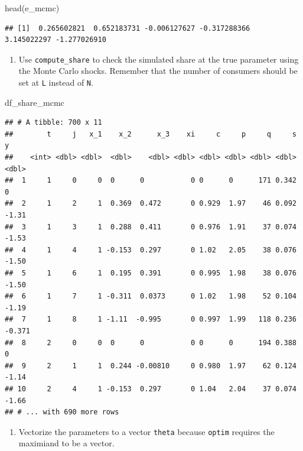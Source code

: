 \documentclass[
]{book}
\newenvironment{Shaded}{\begin{snugshade}}{\end{snugshade}}
\newcommand{\FunctionTok}[1]{\textcolor[rgb]{0.00,0.00,0.00}{#1}}
\newcommand{\NormalTok}[1]{#1}
\providecommand{\tightlist}{%
  \setlength{\itemsep}{0pt}\setlength{\parskip}{0pt}}
\begin{document}
\begin{Shaded}
\begin{Highlighting}[]
\FunctionTok{head}\NormalTok{(e\_mcmc)}
\end{Highlighting}
\end{Shaded}

\begin{verbatim}
## [1]  0.265602821  0.652183731 -0.006127627 -0.317288366  3.145022297 -1.277026910
\end{verbatim}

\begin{enumerate}
\def\labelenumi{\arabic{enumi}.}
\setcounter{enumi}{2}
\tightlist
\item
  Use \texttt{compute\_share} to check the simulated share at the true parameter using the Monte Carlo shocks. Remember that the number of consumers should be set at \texttt{L} instead of \texttt{N}.
\end{enumerate}

\begin{Shaded}
\begin{Highlighting}[]
\NormalTok{df\_share\_mcmc}
\end{Highlighting}
\end{Shaded}

\begin{verbatim}
## # A tibble: 700 x 11
##        t     j   x_1    x_2      x_3    xi     c     p     q     s      y
##    <int> <dbl> <dbl>  <dbl>    <dbl> <dbl> <dbl> <dbl> <dbl> <dbl>  <dbl>
##  1     1     0     0  0      0           0 0      0      171 0.342  0    
##  2     1     2     1  0.369  0.472       0 0.929  1.97    46 0.092 -1.31 
##  3     1     3     1  0.288  0.411       0 0.976  1.91    37 0.074 -1.53 
##  4     1     4     1 -0.153  0.297       0 1.02   2.05    38 0.076 -1.50 
##  5     1     6     1  0.195  0.391       0 0.995  1.98    38 0.076 -1.50 
##  6     1     7     1 -0.311  0.0373      0 1.02   1.98    52 0.104 -1.19 
##  7     1     8     1 -1.11  -0.995       0 0.997  1.99   118 0.236 -0.371
##  8     2     0     0  0      0           0 0      0      194 0.388  0    
##  9     2     1     1  0.244 -0.00810     0 0.980  1.97    62 0.124 -1.14 
## 10     2     4     1 -0.153  0.297       0 1.04   2.04    37 0.074 -1.66 
## # ... with 690 more rows
\end{verbatim}

\begin{enumerate}
\def\labelenumi{\arabic{enumi}.}
\setcounter{enumi}{4}
\tightlist
\item
  Vectorize the parameters to a vector \texttt{theta} because \texttt{optim} requires the maximiand to be a vector.
\end{enumerate}
\end{document}
